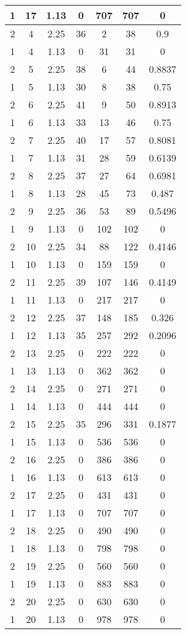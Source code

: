 \documentclass[letterpaper, 12pt]{article}
\begin{document}
\begin{longtable}{|c|c|c|c|c|c|c|}
1 & 17 & 1.13 & 0 & 707 & 707 & 0 \\
\hline
2 & 4 & 2.25 & 36 & 2 & 38 & 0.9 \\
\hline
1 & 4 & 1.13 & 0 & 31 & 31 & 0 \\
\hline
2 & 5 & 2.25 & 38 & 6 & 44 & 0.8837 \\
\hline
1 & 5 & 1.13 & 30 & 8 & 38 & 0.75 \\
\hline
2 & 6 & 2.25 & 41 & 9 & 50 & 0.8913 \\
\hline
1 & 6 & 1.13 & 33 & 13 & 46 & 0.75 \\
\hline
2 & 7 & 2.25 & 40 & 17 & 57 & 0.8081 \\
\hline
1 & 7 & 1.13 & 31 & 28 & 59 & 0.6139 \\
\hline
2 & 8 & 2.25 & 37 & 27 & 64 & 0.6981 \\
\hline
1 & 8 & 1.13 & 28 & 45 & 73 & 0.487 \\
\hline
2 & 9 & 2.25 & 36 & 53 & 89 & 0.5496 \\
\hline
1 & 9 & 1.13 & 0 & 102 & 102 & 0 \\
\hline
2 & 10 & 2.25 & 34 & 88 & 122 & 0.4146 \\
\hline
1 & 10 & 1.13 & 0 & 159 & 159 & 0 \\
\hline
2 & 11 & 2.25 & 39 & 107 & 146 & 0.4149 \\
\hline
1 & 11 & 1.13 & 0 & 217 & 217 & 0 \\
\hline
2 & 12 & 2.25 & 37 & 148 & 185 & 0.326 \\
\hline
1 & 12 & 1.13 & 35 & 257 & 292 & 0.2096 \\
\hline
2 & 13 & 2.25 & 0 & 222 & 222 & 0 \\
\hline
1 & 13 & 1.13 & 0 & 362 & 362 & 0 \\
\hline
2 & 14 & 2.25 & 0 & 271 & 271 & 0 \\
\hline
1 & 14 & 1.13 & 0 & 444 & 444 & 0 \\
\hline
2 & 15 & 2.25 & 35 & 296 & 331 & 0.1877 \\
\hline
1 & 15 & 1.13 & 0 & 536 & 536 & 0 \\
\hline
2 & 16 & 2.25 & 0 & 386 & 386 & 0 \\
\hline
1 & 16 & 1.13 & 0 & 613 & 613 & 0 \\
\hline
2 & 17 & 2.25 & 0 & 431 & 431 & 0 \\
\hline
1 & 17 & 1.13 & 0 & 707 & 707 & 0 \\
\hline
2 & 18 & 2.25 & 0 & 490 & 490 & 0 \\
\hline
1 & 18 & 1.13 & 0 & 798 & 798 & 0 \\
\hline
2 & 19 & 2.25 & 0 & 560 & 560 & 0 \\
\hline
1 & 19 & 1.13 & 0 & 883 & 883 & 0 \\
\hline
2 & 20 & 2.25 & 0 & 630 & 630 & 0 \\
\hline
1 & 20 & 1.13 & 0 & 978 & 978 & 0 \\
\hline
\end{longtable}
\end{document}
